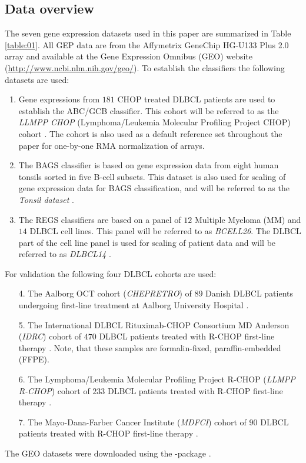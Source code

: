 \documentclass{article}
\begin{document}
\subsection{Data overview}
The seven gene expression datasets used in this paper are summarized in Table \ref{table:01}.
All GEP data are from the Affymetrix GeneChip HG-U133 Plus 2.0 array and available at the Gene Expression Omnibus (GEO) \citep{Barrett2013} website (\url{http://www.ncbi.nlm.nih.gov/geo/}).
To establish the classifiers the following datasets are used:
\begin{enumerate}
  \item Gene expressions from $181$ CHOP treated DLBCL patients are used to establish the ABC/GCB classifier.
  This cohort will be referred to as the \emph{LLMPP CHOP} (Lymphoma/Leukemia Molecular Profiling Project CHOP) cohort \citep{Lenz2008a}.
  The cohort is also used as a default reference set throughout the paper for one-by-one RMA normalization of arrays.
  \item The BAGS classifier is based on gene expression data from eight human tonsils sorted in five B-cell subsets.
  This dataset is also used for scaling of gene expression data for BAGS classification, and will be referred to as the \emph{Tonsil dataset} \citep{DybkaerBoegsted2015}.
  \item The REGS classifiers are based on a panel of $12$ Multiple Myeloma (MM) and $14$ DLBCL cell lines.
  This panel will be referred to as \emph{BCELL26}.
  The DLBCL part of the cell line panel is used for scaling of patient data and will be referred to as \emph{DLBCL14} \citep{Falgreen2015}.
\end{enumerate}
For validation the following four DLBCL cohorts are used:
\begin{enumerate}
  \item[4.] The Aalborg OCT cohort (\emph{CHEPRETRO}) of $89$ Danish DLBCL patients undergoing first-line treatment at Aalborg University Hospital \citep{DybkaerBoegsted2015}.
  \item[5.] The International DLBCL Rituximab-CHOP Consortium MD Anderson (\emph{IDRC}) cohort of $470$ DLBCL patients treated with R-CHOP first-line therapy \citep{Visco2012}.
  Note, that these samples are formalin-fixed, paraffin-embedded (FFPE).
  \item[6.] The Lymphoma/Leukemia Molecular Profiling Project R-CHOP (\emph{LLMPP R-CHOP}) cohort of $233$ DLBCL patients treated with R-CHOP first-line therapy \citep{Lenz2008a}.
  \item[7.] The Mayo-Dana-Farber Cancer Institute (\emph{MDFCI}) cohort of $90$ DLBCL patients treated with R-CHOP first-line therapy \citep{Monti2012a}.
\end{enumerate}
The GEO datasets were downloaded using the \R{}-package  \citep{DLBCLdata}.
\end{document}
